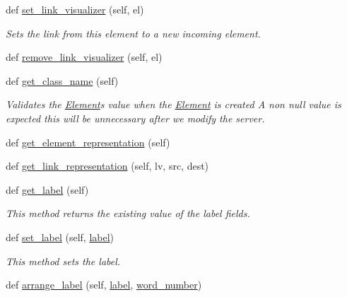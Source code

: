 \begin{DoxyCompactItemize}
def \hyperlink{class_bridges_1_1element_1_1_element_a6ae09d81f76766ab3de9e48f01c5d509}{set\+\_\+link\+\_\+visualizer} (self, el)
\begin{DoxyCompactList}\small\item\em Sets the link from this element to a new incoming element. \end{DoxyCompactList}\item 
def \hyperlink{class_bridges_1_1element_1_1_element_a6e5f677881cc9837963c7d1082a6e079}{remove\+\_\+link\+\_\+visualizer} (self, el)
\item 
def \hyperlink{class_bridges_1_1element_1_1_element_ade4aee8d863fcb0233d1f1f659b1c0a6}{get\+\_\+class\+\_\+name} (self)
\begin{DoxyCompactList}\small\item\em Validates the \hyperlink{class_bridges_1_1element_1_1_element}{Element}\textquotesingle{}s value when the \hyperlink{class_bridges_1_1element_1_1_element}{Element} is created A non null value is expected this will be unnecessary after we modify the server. \end{DoxyCompactList}\item 
def \hyperlink{class_bridges_1_1element_1_1_element_af40cae0b8b917516c86936d3d0d16f3b}{get\+\_\+element\+\_\+representation} (self)
\item 
def \hyperlink{class_bridges_1_1element_1_1_element_a3ec5ef88f83374296a873fed8f0f1806}{get\+\_\+link\+\_\+representation} (self, lv, src, dest)
\item 
def \hyperlink{class_bridges_1_1element_1_1_element_a8705da5768e08fdcd5a73979c7e47c80}{get\+\_\+label} (self)
\begin{DoxyCompactList}\small\item\em This method returns the existing value of the label fields. \end{DoxyCompactList}\item 
def \hyperlink{class_bridges_1_1element_1_1_element_a87e7664cd328b32bd978b241d8f8ad88}{set\+\_\+label} (self, \hyperlink{class_bridges_1_1element_1_1_element_ad5a528474853ed245d14e7d4db015294}{label})
\begin{DoxyCompactList}\small\item\em This method sets the label. \end{DoxyCompactList}\item 
def \hyperlink{class_bridges_1_1element_1_1_element_a17f4120ec937cee6779aaa9f2139d3a7}{arrange\+\_\+label} (self, \hyperlink{class_bridges_1_1element_1_1_element_ad5a528474853ed245d14e7d4db015294}{label}, \hyperlink{class_bridges_1_1element_1_1_element_a63a7f47da997db2df55a22715e519dff}{word\+\_\+number})

\end{DoxyCompactItemize}
